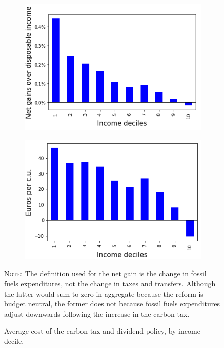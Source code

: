 \documentclass[12pt]{article} %
\begin{document}
\begin{appendices}
\begin{figure}[H]
\begin{subfigure}{.5\textwidth}
\centering
\includegraphics[scale=0.9]{Images/effort_rate_uc.png}
\end{subfigure}\hfill
\begin{subfigure}{.5\textwidth}
\centering
\includegraphics[scale=0.9]{Images/average_cost_decile.png}
\end{subfigure}
\caption{Average cost of the carbon tax and dividend policy, by income decile.}
\label{figure:effort_rate_uc}
\vspace{0.5cm}
{\footnotesize
\textsc{Note:} The definition used for the net gain is the change in fossil fuels expenditures, not the change in taxes and transfers. Although the latter would sum to zero in aggregate because the reform is budget neutral, the former does not because fossil fuels expenditures adjust downwards following the increase in the carbon tax.
}
\end{figure}

\vspace{1cm}


\end{appendices}
\end{document}
